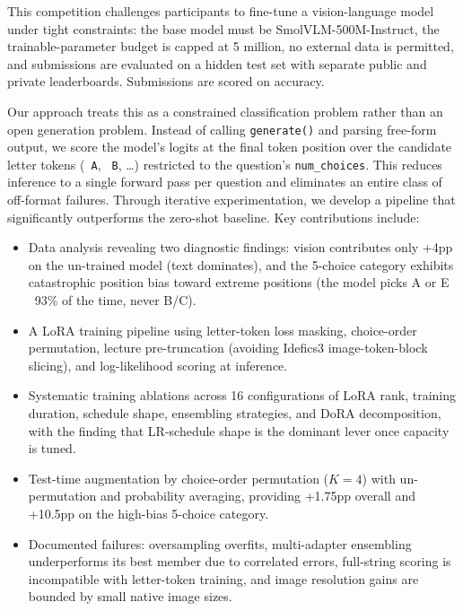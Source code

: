 \documentclass[11pt]{article}
\begin{document}
This competition challenges participants to fine-tune a vision-language model under tight constraints: the base model must be SmolVLM-500M-Instruct, the trainable-parameter budget is capped at 5 million, no external data is permitted, and submissions are evaluated on a hidden test set with separate public and private leaderboards. Submissions are scored on accuracy.

Our approach treats this as a constrained classification problem rather than an open generation problem. Instead of calling \texttt{generate()} and parsing free-form output, we score the model's logits at the final token position over the candidate letter tokens (\texttt{ A}, \texttt{ B}, \dots) restricted to the question's \texttt{num\_choices}. This reduces inference to a single forward pass per question and eliminates an entire class of off-format failures. Through iterative experimentation, we develop a pipeline that significantly outperforms the zero-shot baseline. Key contributions include:

\begin{itemize}
    \item Data analysis revealing two diagnostic findings: vision contributes only +4pp on the un-trained model (text dominates), and the 5-choice category exhibits catastrophic position bias toward extreme positions (the model picks A or E ~93\% of the time, never B/C).
    \item A LoRA training pipeline using letter-token loss masking, choice-order permutation, lecture pre-truncation (avoiding Idefics3 image-token-block slicing), and log-likelihood scoring at inference.
    \item Systematic training ablations across 16 configurations of LoRA rank, training duration, schedule shape, ensembling strategies, and DoRA decomposition, with the finding that LR-schedule shape is the dominant lever once capacity is tuned.
    \item Test-time augmentation by choice-order permutation (\(K{=}4\)) with un-permutation and probability averaging, providing +1.75pp overall and +10.5pp on the high-bias 5-choice category.
    \item Documented failures: oversampling overfits, multi-adapter ensembling underperforms its best member due to correlated errors, full-string scoring is incompatible with letter-token training, and image resolution gains are bounded by small native image sizes.
\end{itemize}

\end{document}
